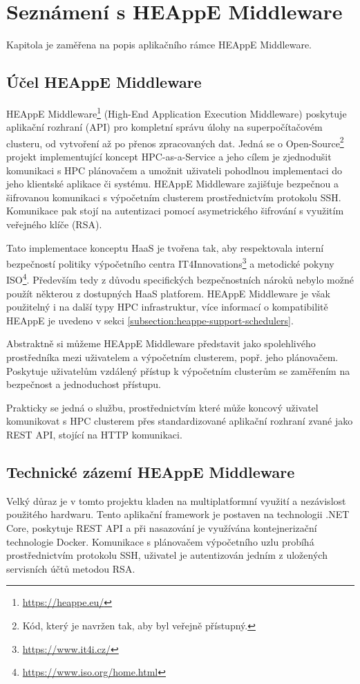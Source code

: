 \chapter{Seznámení s HEAppE Middleware}\label{chapter:chapter-about-heappe-middleware}
Kapitola je zaměřena na popis aplikačního rámce HEAppE Middleware.

\section{Účel HEAppE Middleware}
HEAppE Middleware\footnote{\href{https://heappe.eu/}{https://heappe.eu/}} (High-End Application Execution Middleware) poskytuje aplikační rozhraní (API) pro kompletní správu úlohy na superpočítačovém clusteru, od vytvoření až po přenos zpracovaných dat. Jedná se o Open-Source\footnote{Kód, který je navržen tak, aby byl veřejně přístupný.} projekt implementující koncept HPC-as-a-Service a jeho cílem je zjednodušit komunikaci s HPC plánovačem a umožnit uživateli pohodlnou implementaci do jeho klientské aplikace či systému. HEAppE Middleware zajišťuje bezpečnou a šifrovanou komunikaci s výpočetním clusterem prostřednictvím protokolu SSH. Komunikace pak stojí na autentizaci pomocí asymetrického šifrování s využitím veřejného klíče (RSA).

Tato implementace konceptu HaaS je tvořena tak, aby respektovala interní bezpečností politiky výpočetního centra IT4Innovations\footnote{\href{https://www.it4i.cz/}{https://www.it4i.cz/}} a metodické pokyny ISO\footnote{\href{https://www.iso.org/home.html}{https://www.iso.org/home.html}}. Především tedy z důvodu specifických bezpečnostních nároků nebylo možné použít některou z dostupných HaaS platforem. HEAppE Middleware je však použitelný i na další typy HPC infrastruktur, více informací o kompatibilitě HEAppE je uvedeno v sekci \ref{subsection:heappe-support-schedulers}.


Abstraktně si můžeme HEAppE Middleware představit jako spolehlivého prostředníka mezi uživatelem a výpočetním clusterem, popř. jeho plánovačem. Poskytuje uživatelům vzdálený přístup k výpočetním clusterům se zaměřením na bezpečnost a jednoduchost přístupu.

Prakticky se jedná o službu, prostřednictvím které může koncový uživatel komunikovat s HPC clusterem přes standardizované aplikační rozhraní zvané jako REST API, stojící na HTTP komunikaci.


\section{Technické zázemí HEAppE Middleware}
Velký důraz je v tomto projektu kladen na multiplatformní využití a nezávislost použitého hardwaru. Tento aplikační framework je postaven na technologii .NET Core, poskytuje REST API a při nasazování je využívána kontejnerizační technologie Docker. Komunikace s plánovačem výpočetního uzlu probíhá prostřednictvím protokolu SSH, uživatel je autentizován jedním z uložených servisních účtů metodou RSA.

